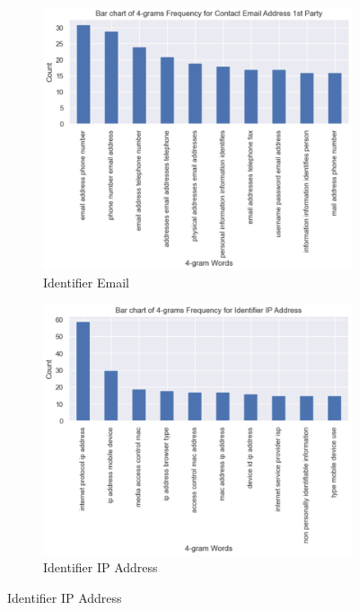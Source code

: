 \begin{figure}[!ht]
	\medskip
  
	\begin{subfigure}[t]{.5\textwidth}
	  \centering
	  \includegraphics[width=\linewidth]{figures/4_grams_email.png}
	  \caption{Identifier Email}
	\end{subfigure}
	\hfill
	\begin{subfigure}[t]{.5\textwidth}
	  \centering
	  \includegraphics[width=\linewidth]{figures/4_grams_ip_address.png}
	  \caption{Identifier IP Address}
	\end{subfigure}

\end{figure}
